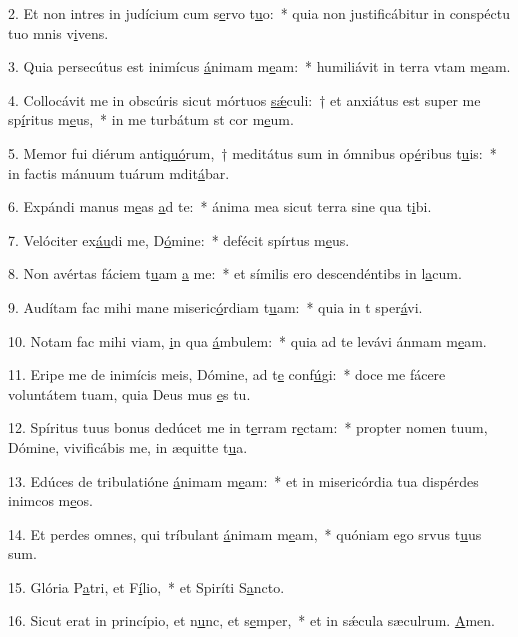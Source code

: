 2. Et non intres in judícium cum s\uline{e}rvo t\uline{u}o:~* quia non justificábitur in conspéctu tuo mnis v\uline{i}vens.\par 
3. Quia persecútus est inimícus \uline{á}nimam m\uline{e}am:~* humiliávit in terra vtam m\uline{e}am.\par 
4. Collocávit me in obscúris sicut mórtuos \uline{sǽ}culi:~† et anxiátus est super me sp\uline{í}ritus m\uline{e}us,~* in me turbátum st cor m\uline{e}um.\par 
5. Memor fui diérum anti\uline{quó}rum,~† meditátus sum in ómnibus op\uline{é}ribus t\uline{u}is:~* in factis mánuum tuárum mdit\uline{á}bar.\par 
6. Expándi manus m\uline{e}as \uline{a}d te:~* ánima mea sicut terra sine qua t\uline{i}bi.\par 
7. Velóciter ex\uline{áu}di me, D\uline{ó}mine:~* defécit spírtus m\uline{e}us.\par 
8. Non avértas fáciem t\uline{u}am \uline{a} me:~* et símilis ero descendéntibs in l\uline{a}cum.\par 
9. Audítam fac mihi mane miseric\uline{ó}rdiam t\uline{u}am:~* quia in t sper\uline{á}vi.\par 
10. Notam fac mihi viam, \uline{i}n qua \uline{á}mbulem:~* quia ad te levávi ánmam m\uline{e}am.\par 
11. Eripe me de inimícis meis, Dómine, ad t\uline{e} conf\uline{ú}gi:~* doce me fácere voluntátem tuam, quia Deus mus \uline{e}s tu.\par 
12. Spíritus tuus bonus dedúcet me in t\uline{e}rram r\uline{e}ctam:~* propter nomen tuum, Dómine, vivificábis me, in æquitte t\uline{u}a.\par 
13. Edúces de tribulatióne \uline{á}nimam m\uline{e}am:~* et in misericórdia tua dispérdes inimcos m\uline{e}os.\par 
14. Et perdes omnes, qui tríbulant \uline{á}nimam m\uline{e}am,~* quóniam ego srvus t\uline{u}us sum.\par 
15. Glória P\uline{a}tri, et F\uline{í}lio,~* et Spiríti S\uline{a}ncto.\par 
16. Sicut erat in princípio, et n\uline{u}nc, et s\uline{e}mper,~* et in sǽcula sæculrum. \uline{A}men.\par 
